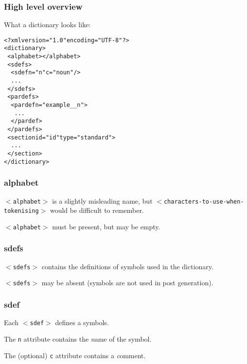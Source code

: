\documentclass{beamer} %
\begin{document}
\begin{frame}
  \frametitle{High level overview}

  \begin{exampleblock}{What a dictionary looks like:}
    \begin{footnotesize}
    \begin{alltt}
      <?xml version="1.0" encoding="UTF-8"?>\\
      <dictionary>\\
      ~<alphabet></alphabet>\\
      ~<sdefs>\\
      ~~<sdef n="n" c="noun"/>\\
      ~~...\\
      ~</sdefs>\\
      ~<pardefs>\\
      ~~<pardef n="example\_\_n">\\
      ~~~...\\
      ~~</pardef>\\
      ~</pardefs>\\
      ~<section id="id" type="standard">\\
      ~~...\\
      ~</section>\\
      </dictionary>\\
    \end{alltt}
    \end{footnotesize}
\end{exampleblock}

\end{frame}

\begin{frame}
  \frametitle{alphabet}

  {\tt $<$alphabet$>$} is a slightly misleading name, but
  {\tt $<$characters-to-use-when-tokenising$>$} would be 
  difficult to remember.

  {\tt $<$alphabet$>$} must be present, but may be empty.
\end{frame}

\begin{frame}
  \frametitle{sdefs}

  {\tt $<$sdefs$>$} contains the definitions of symbols used
  in the dictionary.

  {\tt $<$sdefs$>$} may be absent (symbols are not used
  in post generation).
\end{frame}

\begin{frame}
  \frametitle{sdef}

  Each {\tt $<$sdef$>$} defines a symbols.

  The {\tt n} attribute contains the {\it n}ame of the symbol.

  The (optional) {\tt c} attribute contains a {\it c}omment.

\end{frame}
\end{document}
